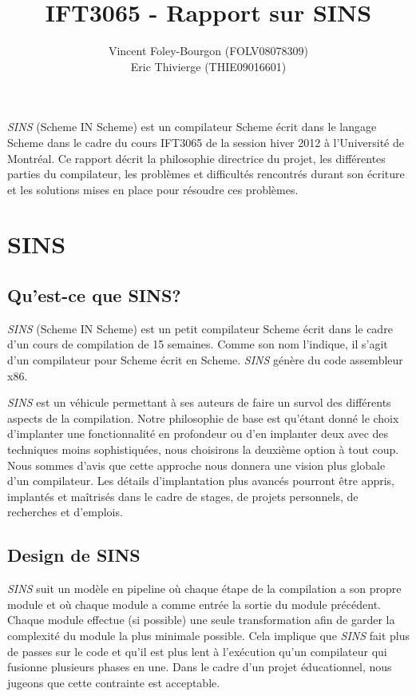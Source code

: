 \documentclass[10pt]{report}
\begin{document}
\newcommand{\sins}{\emph{SINS}}
\newcommand{\bop}{\textbf{(}}
\newcommand{\bcp}{\textbf{)}}

\title{IFT3065 - Rapport sur SINS}
\author{Vincent Foley-Bourgon (FOLV08078309) \\
Eric Thivierge (THIE09016601)}
\maketitle

\abstract

\sins{} (Scheme IN Scheme) est un compilateur Scheme écrit dans le
langage Scheme dans le cadre du cours IFT3065 de la session hiver 2012
à l'Université de Montréal.  Ce rapport décrit la philosophie
directrice du projet, les différentes parties du compilateur, les
problèmes et difficultés rencontrés durant son écriture et les
solutions mises en place pour résoudre ces problèmes.

\chapter{SINS}

\section{Qu'est-ce que SINS?}

\sins{} (Scheme IN Scheme) est un petit compilateur Scheme écrit
dans le cadre d'un cours de compilation de 15 semaines.  Comme son nom
l'indique, il s'agit d'un compilateur pour Scheme écrit en Scheme.
\sins{} génère du code assembleur x86.

\sins{} est un véhicule permettant à ses auteurs de faire un survol
des différents aspects de la compilation. Notre philosophie de base
est qu'étant donné le choix d'implanter une fonctionnalité en
profondeur ou d'en implanter deux avec des techniques moins
sophistiquées, nous choisirons la deuxième option à tout coup. Nous
sommes d'avis que cette approche nous donnera une vision plus globale
d'un compilateur. Les détails d'implantation plus avancés pourront
être appris, implantés et maîtrisés dans le cadre de stages, de
projets personnels, de recherches et d'emplois.


\section{Design de SINS}

\sins{} suit un modèle en pipeline où chaque étape de la compilation a
son propre module et où chaque module a comme entrée la sortie du
module précédent. Chaque module effectue (si possible) une seule
transformation afin de garder la complexité du module la plus minimale
possible. Cela implique que \sins{} fait plus de passes sur le code et
qu'il est plus lent à l'exécution qu'un compilateur qui fusionne
plusieurs phases en une. Dans le cadre d'un projet éducationnel, nous
jugeons que cette contrainte est acceptable.
\end{document}

